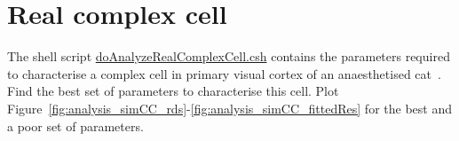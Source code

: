 \documentclass[12pt]{article}
\begin{document}
\section{Real complex cell}

The shell script
\href{https://github.com/joacorapela/neuroinformatics24/blob/master/worksheets/06_linearRegression/code/scripts/doAnalyzeRealComplexCell.csh}{doAnalyzeRealComplexCell.csh}
contains the parameters required to characterise a complex cell in primary
visual cortex of an anaesthetised cat~\citep{felsenEtAl05}. Find the best set of
parameters to characterise this cell. Plot
Figure~\ref{fig:analysis_simCC_rds}-\ref{fig:analysis_simCC_fittedRes} for the
best and a poor set of parameters.




\end{document}
